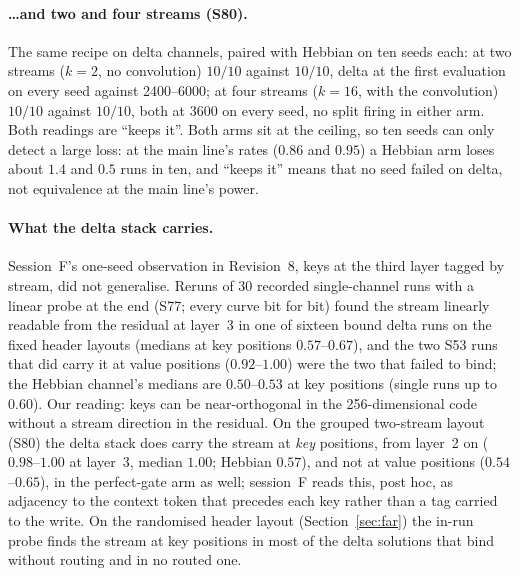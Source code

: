 \documentclass[11pt]{article}
\begin{document}
\paragraph{\ldots and two and four streams (S80).} The same recipe on delta channels, paired with Hebbian on ten seeds each: at two streams ($k = 2$, no convolution) $10/10$ against $10/10$, delta at the first evaluation on every seed against 2400--6000; at four streams ($k = 16$, with the convolution) $10/10$ against $10/10$, both at 3600 on every seed, no split firing in either arm. Both readings are ``keeps it''. Both arms sit at the ceiling, so ten seeds can only detect a large loss: at the main line's rates ($0.86$ and $0.95$) a Hebbian arm loses about $1.4$ and $0.5$ runs in ten, and ``keeps it'' means that no seed failed on delta, not equivalence at the main line's power.

\paragraph{What the delta stack carries.} Session~F's one-seed observation in Revision~8, keys at the third layer tagged by stream, did not generalise. Reruns of 30 recorded single-channel runs with a linear probe at the end (S77; every curve bit for bit) found the stream linearly readable from the residual at layer~3 in one of sixteen bound delta runs on the fixed header layouts (medians at key positions $0.57$--$0.67$), and the two S53 runs that did carry it at value positions ($0.92$--$1.00$) were the two that failed to bind; the Hebbian channel's medians are $0.50$--$0.53$ at key positions (single runs up to $0.60$). Our reading: keys can be near-orthogonal in the 256-dimensional code without a stream direction in the residual. On the grouped two-stream layout (S80) the delta stack does carry the stream at \emph{key} positions, from layer~2 on ($0.98$--$1.00$ at layer~3, median $1.00$; Hebbian $0.57$), and not at value positions ($0.54$--$0.65$), in the perfect-gate arm as well; session~F reads this, post hoc, as adjacency to the context token that precedes each key rather than a tag carried to the write. On the randomised header layout (Section~\ref{sec:far}) the in-run probe finds the stream at key positions in most of the delta solutions that bind without routing and in no routed one.
\end{document}
